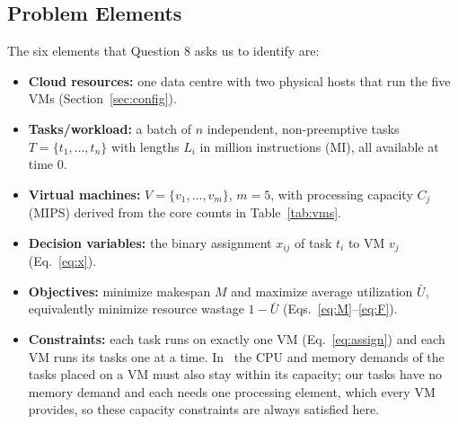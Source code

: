 \documentclass[journal,onecolumn,12pt]{IEEEtran}
\newcommand{\Ubar}{\bar{U}}
\begin{document}
\subsection{Problem Elements}
The six elements that Question 8 asks us to identify are:
\begin{itemize}
\item \textbf{Cloud resources:} one data centre with two physical hosts that run the five VMs (Section~\ref{sec:config}).
\item \textbf{Tasks/workload:} a batch of $n$ independent, non-preemptive tasks $T=\{t_1,\dots,t_n\}$ with lengths $L_i$ in million instructions (MI), all available at time 0.
\item \textbf{Virtual machines:} $V=\{v_1,\dots,v_m\}$, $m=5$, with processing capacity $C_j$ (MIPS) derived from the core counts in Table~\ref{tab:vms}.
\item \textbf{Decision variables:} the binary assignment $x_{ij}$ of task $t_i$ to VM $v_j$ (Eq.~\ref{eq:x}).
\item \textbf{Objectives:} minimize makespan $M$ and maximize average utilization $\Ubar$, equivalently minimize resource wastage $1-\Ubar$ (Eqs.~\ref{eq:M}--\ref{eq:F}).
\item \textbf{Constraints:} each task runs on exactly one VM (Eq.~\ref{eq:assign}) and each VM runs its tasks one at a time. In~\cite{dehury} the CPU and memory demands of the tasks placed on a VM must also stay within its capacity; our tasks have no memory demand and each needs one processing element, which every VM provides, so these capacity constraints are always satisfied here.
\end{itemize}
\end{document}
